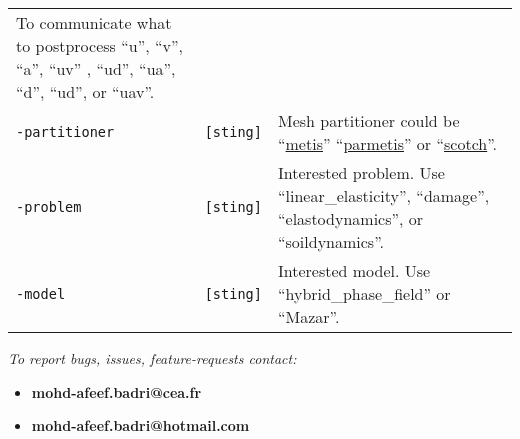 \begin{longtable}[]{@{}lll@{}}
\begin{minipage}[t]{0.56\columnwidth}
To communicate what to postprocess ``u'', ``v'', ``a'', ``uv'' , ``ud'',
``ua'', ``d'', ``ud'', or ``uav''.\strut
\end{minipage}\tabularnewline
\begin{minipage}[t]{0.26\columnwidth}\raggedright\strut
\lstinline!-partitioner!\strut
\end{minipage} & \begin{minipage}[t]{0.09\columnwidth}\raggedright\strut
\lstinline![sting]!\strut
\end{minipage} & \begin{minipage}[t]{0.56\columnwidth}\raggedright\strut
Mesh partitioner could be
``\href{http://glaros.dtc.umn.edu/gkhome/metis/metis/overview}{metis}''
``\href{http://glaros.dtc.umn.edu/gkhome/metis/parmetis/overview}{parmetis}''
or ``\href{http://www.labri.fr/perso/pelegrin/scotch/}{scotch}''.\strut
\end{minipage}\tabularnewline
\begin{minipage}[t]{0.26\columnwidth}\raggedright\strut
\lstinline!-problem!\strut
\end{minipage} & \begin{minipage}[t]{0.09\columnwidth}\raggedright\strut
\lstinline![sting]!\strut
\end{minipage} & \begin{minipage}[t]{0.56\columnwidth}\raggedright\strut
Interested problem. Use ``linear\_elasticity'', ``damage'',
``elastodynamics'', or ``soildynamics''.\strut
\end{minipage}\tabularnewline
\begin{minipage}[t]{0.26\columnwidth}\raggedright\strut
\lstinline!-model!\strut
\end{minipage} & \begin{minipage}[t]{0.09\columnwidth}\raggedright\strut
\lstinline![sting]!\strut
\end{minipage} & \begin{minipage}[t]{0.56\columnwidth}\raggedright\strut
Interested model. Use ``hybrid\_phase\_field'' or ``Mazar''.\strut
\end{minipage}\tabularnewline
\bottomrule
\end{longtable}

\emph{To report bugs, issues, feature-requests contact:}

\begin{itemize}
\tightlist
\item
  \textbf{mohd-afeef.badri@cea.fr}
\item
  \textbf{mohd-afeef.badri@hotmail.com}
\end{itemize}
